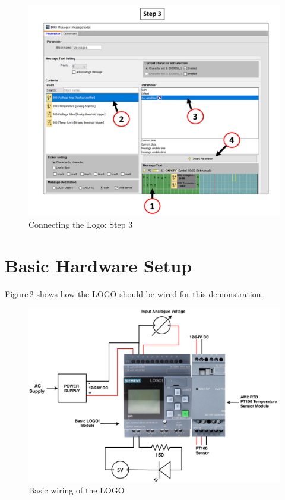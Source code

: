 \documentclass[11pt]{IEEEtran}
\begin{document}
\begin{figure}[H]
	\centering
	\includegraphics[scale=0.83]{Step3.pdf}
	\caption{Connecting the Logo: Step 3}
	\label{fig:Messages}
\end{figure}

\section{Basic Hardware Setup}
\noindent Figure\,\ref{fig:basic wiring} shows how the LOGO should be wired for this demonstration. 
\begin{figure}[H]
	\centering
	\includegraphics[scale=0.6]{LogoBasicWiring.pdf}
	\caption{Basic wiring of the LOGO}
	\label{fig:basic wiring}
\end{figure}
\end{document}
